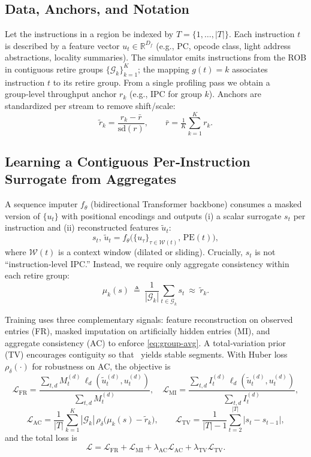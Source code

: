 \subsection{Data, Anchors, and Notation}
Let the instructions in a region be indexed by \(T=\{1,\ldots,|T|\}\). Each instruction \(t\) is described by a feature vector \(u_t\in\mathbb{R}^{D_f}\) (e.g., PC, opcode class, light address abstractions, locality summaries). The simulator emits instructions from the ROB in contiguous retire groups \(\{\mathcal{G}_k\}_{k=1}^K\); the mapping \(g(t)=k\) associates instruction \(t\) to its retire group. From a single profiling pass we obtain a group‑level throughput anchor \(r_k\) (e.g., IPC for group \(k\)). Anchors are standardized per stream to remove shift/scale:
\[
\tilde{r}_k=\frac{r_k-\bar{r}}{\mathrm{sd}(r)},\qquad \bar{r}=\tfrac{1}{K}\sum_{k=1}^Kr_k.
\]

\subsection{Learning a Contiguous Per‑Instruction Surrogate from Aggregates}
A sequence imputer \(f_\theta\) (bidirectional Transformer backbone) consumes a masked version of \(\{u_t\}\) with positional encodings and outputs (i) a scalar surrogate \(s_t\) per instruction and (ii) reconstructed features \(\tilde{u}_t\):
\[
s_t,\,\tilde{u}_t=f_\theta\!\big(\{u_\tau\}_{\tau\in\mathcal{W}(t)},\,\mathrm{PE}(t)\big),
\]
where \(\mathcal{W}(t)\) is a context window (dilated or sliding). Crucially, \(s_t\) is not “instruction‑level IPC.” Instead, we require only aggregate consistency within each retire group:
\begin{equation}
\mu_k(s)\ \triangleq\ \frac{1}{|\mathcal{G}_k|}\sum_{t\in\mathcal{G}_k}s_t\ \approx\ \tilde{r}_k.
\label{eq:group-avg}
\end{equation}

Training uses three complementary signals: feature reconstruction on observed entries (FR), masked imputation on artificially hidden entries (MI), and aggregate consistency (AC) to enforce \eqref{eq:group-avg}. A total‑variation prior (TV) encourages contiguity so that \cpd\ yields stable segments. With Huber loss \(\rho_\delta(\cdot)\) for robustness on AC, the objective is
\[
\mathcal{L}_{\mathrm{FR}}=\frac{\sum_{t,d}M_t^{(d)}\,\ell_d(\tilde{u}_t^{(d)},u_t^{(d)})}{\sum_{t,d}M_t^{(d)}},\quad
\mathcal{L}_{\mathrm{MI}}=\frac{\sum_{t,d}I_t^{(d)}\,\ell_d(\tilde{u}_t^{(d)},u_t^{(d)})}{\sum_{t,d}I_t^{(d)}},
\]
\[
\mathcal{L}_{\mathrm{AC}}=\frac{1}{|T|}\sum_{k=1}^K |\mathcal{G}_k|\,\rho_\delta\!\big(\mu_k(s)-\tilde{r}_k\big),\qquad
\mathcal{L}_{\mathrm{TV}}=\frac{1}{|T|-1}\sum_{t=2}^{|T|} |s_t-s_{t-1}|,
\]
and the total loss is
\[
\mathcal{L}=\mathcal{L}_{\mathrm{FR}}+\mathcal{L}_{\mathrm{MI}}+\lambda_{\mathrm{AC}}\mathcal{L}_{\mathrm{AC}}+\lambda_{\mathrm{TV}}\mathcal{L}_{\mathrm{TV}}.
\]

